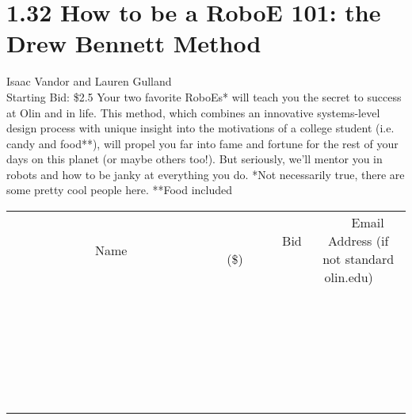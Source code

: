 \documentclass[11pt]{article}
\begin{document}
\section*{1.32 How to be a RoboE 101: the Drew Bennett Method}
Isaac Vandor and Lauren Gulland
\\
Starting Bid: \$2.5
\newline
Your two favorite RoboEs* will teach you the secret to success at Olin and in life. This method, which combines an innovative systems-level design process with unique insight into the motivations of a college student (i.e. candy and food**), will propel you far into fame and fortune for the rest of your days on this planet (or maybe others too!). But seriously, we'll mentor you in robots and how to be janky at everything you do.       *Not necessarily true, there are some pretty cool people here.  **Food included
\\[6ex]
\begin{tabular}{c c c}
~~~~~~~~~~~~~Name~~~~~~~~~~~~~ & ~~~~~~~~~Bid (\$)~~~~~~~~~  & ~~~Email Address (if not standard olin.edu)~~~\\
 & & \\
\hline
 & & \\
\hline
 & & \\
\hline
 & & \\
\hline
 & & \\
\hline
 & & \\
\hline
 & & \\
\hline
 & & \\
\hline
 & & \\
\hline
 & & \\
\hline
 & & \\
\hline
 & & \\
\hline
 & & \\
\hline
 & & \\
\hline
 & & \\
\hline
 & & \\
\hline
 & & \\
\hline
 & & \\
\hline
 & & \\
\hline
 & & \\
\hline
 & & \\
\hline
 & & \\
\hline
 & & \\
\hline
 & & \\
\hline
 & & \\
\hline
 & & \\
\hline
\end{tabular}
\newpage
\end{document}
